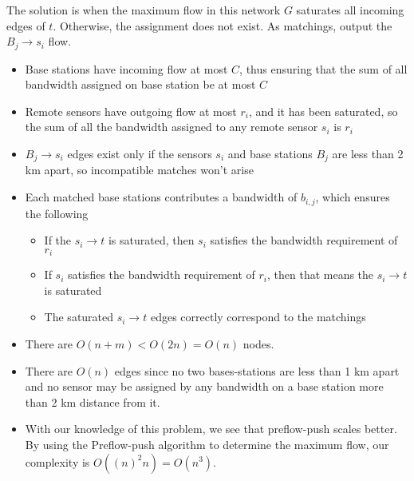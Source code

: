 The solution is when the maximum flow in this network $G$ saturates all incoming edges of $t$. Otherwise, the assignment does not exist. As matchings, output the $B_{j} \rightarrow s_i$ flow.



\begin{itemize}
\item Base stations have incoming flow at most $C$, thus ensuring that the sum of all bandwidth assigned on base station be at most $C$
\item Remote sensors have outgoing flow at most $r_i$, and it has been saturated, so the sum of all the bandwidth assigned to any remote sensor $s_i$ is $r_i$
\item $B_{j} \rightarrow s_i$ edges exist only if the sensors $s_i$ and base stations $B_j$ are less than 2 km apart, so incompatible matches won't arise
\item Each matched base stations contributes a bandwidth of $b_{i,j}$, which ensures the following
	\begin{itemize}
		\item If the $s_i \rightarrow t$ is saturated, then $s_i$ satisfies the bandwidth requirement of $r_i$
		\item If $s_i$ satisfies the bandwidth requirement of $r_i$, then that means the $s_i \rightarrow t$ is saturated
		\item The saturated $s_i \rightarrow t$ edges correctly correspond to the matchings
	\end{itemize}
\end{itemize}


\begin{itemize}
\item There are $O(n+m)<O(2n)=O(n)$ nodes.
\item There are $O(n)$ edges since no two bases-stations are less than 1 km apart and no sensor may be assigned by any bandwidth on a base station more than 2 km distance from it.
\item With our knowledge of this problem, we see that preflow-push scales better. By using the Preflow-push algorithm to determine the maximum flow, our complexity is $O((n)^2 n)=O(n^3)$.
\end{itemize}








